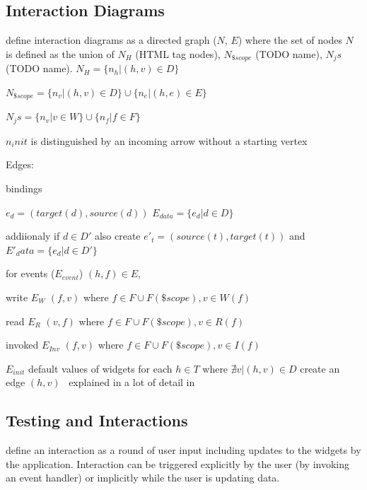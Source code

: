 \subsection{Interaction Diagrams}
\label{intro:zhang_interaction_diagrams}
\textcite{zhang2019scenario} define interaction diagrams as a directed graph ($N$, $E$) where the set of nodes $N$ is defined as the union of $N_H$ (HTML tag nodes), $N_{\$scope}$ (TODO name), $N_js$ (TODO name). 
$N_H = \{n_h | (h,v) \in D\}$ %

$N_{\$scope} = \{n_v | (h,v) \in D\} \cup \{n_e | (h,e) \in E\} $ %

$N_js = \{n_v | v \in W\} \cup \{n_f | f \in F\} $

$n_init$ is distinguished by an incoming arrow without a starting vertex

Edges:

bindings 

$e_d = (target(d),source(d))$
$E_{data} = \{e_d |  d \in D \}$

addiionaly if $d \in D'$ also create $e'_t = (source(t),target(t))$ and $E'_data = \{e_d |  d \in D' \}$

for events ($E_{event}$) $(h,f) \in E$,

write $E_{W}$ $(f,v)$ where $f \in F \cup F(\$scope), v \in W(f)$

read $E_{R}$ $(v,f)$ where $f \in F \cup F(\$scope), v \in R(f)$

invoked $E_{Inv}$ $(f,v)$ where $f \in F \cup F(\$scope), v \in I(f)$


$E_{init}$ default values of widgets 
for each $h \in T $ where $ \nexists v | (h,v) \in D$ create an edge $(h,v)$ 
\
explained in a lot of detail in \parencite[9]{zhang2019scenario}

\subsection{Testing and Interactions}
\textcite{zhang2019scenario} define an interaction as a round of user input including updates to the widgets by the application. Interaction can be triggered explicitly by the user (by invoking an event handler) or implicitly while the user is updating data. \parencite{zhang2019scenario} %

